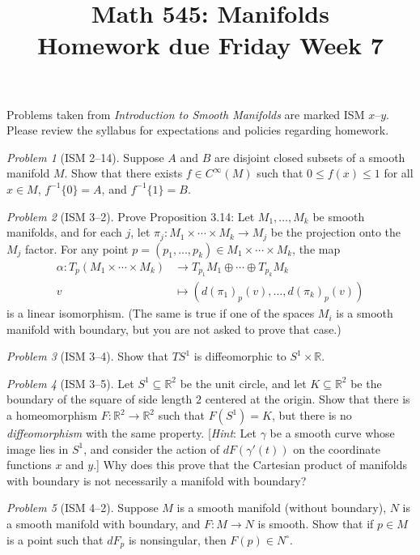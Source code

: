 \documentclass[11pt,twoside]{amsart}
\title{Math 545: Manifolds\\ Homework due Friday Week 7}
\theoremstyle{plain}
\theoremstyle{remark}
\newtheorem{prob}{Problem}
\theoremstyle{definition}
\theoremstyle{definition}
\newcommand{\RR}{\mathbb{R}}
\begin{document}
\maketitle

\noindent Problems taken from \emph{Introduction to Smooth Manifolds} are marked ISM $x$--$y$. Please review the syllabus for expectations and policies regarding homework.

\begin{prob}[ISM 2--14]
Suppose $A$ and $B$ are disjoint closed subsets of a smooth manifold $M$. Show that there exists $f\in C^\infty(M)$ such that $0\le f(x)\le 1$ for all $x\in M$, $f^{-1}\{0\} = A$, and $f^{-1}\{1\} = B$.
\end{prob}

\begin{prob}[ISM 3--2]
Prove Proposition 3.14: Let $M_1,\ldots,M_k$ be smooth manifolds, and for each $j$, let $\pi_j\colon M_1\times \cdots \times M_k\to M_j$ be the projection onto the $M_j$ factor. For any point $p=(p_1,\ldots,p_k)\in M_1\times \cdots \times M_k$, the map
\[
\begin{aligned}
  \alpha \colon T_p(M_1\times \cdots \times M_k)&\longrightarrow T_{p_1}M_1\oplus \cdots \oplus T_{p_k}M_k\\
  v&\longmapsto (d(\pi_1)_p(v),\ldots,d(\pi_k)_p(v))
\end{aligned}
\]
is a linear isomorphism. (The same is true if one of the spaces $M_i$ is a smooth manifold with boundary, but you are not asked to prove that case.)
\end{prob}

\begin{prob}[ISM 3--4]
Show that $TS^1$ is diffeomorphic to $S^1\times \RR$.
\end{prob}

\begin{prob}[ISM 3--5]
Let $S^1\subseteq \RR^2$ be the unit circle, and let $K\subseteq \RR^2$ be the boundary of the square of side length $2$ centered at the origin. Show that there is a homeomorphism $F\colon \RR^2\to \RR^2$ such that $F(S^1) = K$, but there is no \emph{diffeomorphism} with the same property. [\emph{Hint}: Let $\gamma$ be a smooth curve whose image lies in $S^1$, and consider the action of $dF(\gamma'(t))$ on the coordinate functions $x$ and $y$.] Why does this prove that the Cartesian product of manifolds with boundary is not necessarily a manifold with boundary?
\end{prob}

\begin{prob}[ISM 4--2]
Suppose $M$ is a smooth manifold (without boundary), $N$ is a smooth manifold with boundary, and $F\colon M\to N$ is smooth. Show that if $p\in M$ is a point such that $dF_p$ is nonsingular, then $F(p)\in N^\circ$.
\end{prob}
\end{document}
